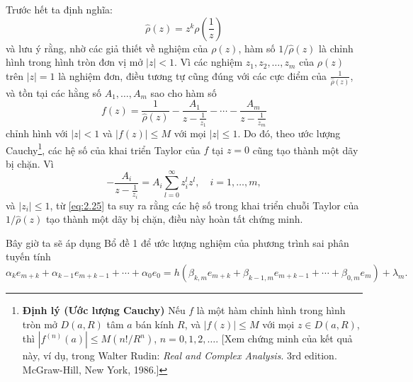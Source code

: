 Trước hết ta định nghĩa: 
\begin{equation*}
    \hat{\rho}(z) = z^k \rho\left(\frac{1}{z}\right)
\end{equation*} 
và lưu ý rằng, nhờ các giả thiết về nghiệm của $\rho(z)$, hàm số ${1}/\hat{\rho}(z)$ là chỉnh hình trong hình tròn đơn vị mở $|z| < 1$. Vì các nghiệm $z_1, z_2, \dots, z_m$ của $\rho(z)$ trên $|z| = 1$ là nghiệm đơn, điều tương tự cũng đúng với các cực điểm của $\frac{1}{\hat{\rho}(z)}$, và tồn tại các hằng số $A_1, \dots, A_m$ sao cho hàm số
\begin{equation}
    f(z) = \frac{1}{\hat{\rho}(z)} - \frac{A_1}{z - \frac{1}{z_1}} - \cdots - \frac{A_m}{z - \frac{1}{z_m}} \tag{2.25} \label{eq:2.25}
\end{equation}
chỉnh hình với $|z| < 1$ và $|f(z)| \le M$ với mọi $|z| \le 1$. Do đó, theo ước lượng Cauchy\footnote{\textbf{Định lý (Ước lượng Cauchy)} Nếu $f$ là một hàm chỉnh hình trong hình tròn mở $D(a, R)$ tâm $a$ bán kính $R$, và $|f(z)| \le M$ với mọi $z \in D(a, R)$, thì $|f^{(n)}(a)| \le M(n! / R^n)$, $n = 0, 1, 2, \dots$. [Xem chứng minh của kết quả này, ví dụ, trong Walter Rudin: \textit{Real and Complex Analysis}. 3rd edition. McGraw-Hill, New York, 1986.]}, các hệ số của khai triển Taylor của $f$ tại $z = 0$ cũng tạo thành một dãy bị chặn. Vì
\begin{equation*}
    -\frac{A_i}{z - \frac{1}{z_i}} = A_i \sum_{l=0}^\infty z_i^l z^l, \quad i = 1, \dots, m,
\end{equation*}
và $|z_i| \le 1$, từ \eqref{eq:2.25} ta suy ra rằng các hệ số trong khai triển chuỗi Taylor của $1/\hat{\rho}(z)$ tạo thành một dãy bị chặn, điều này hoàn tất chứng minh.

Bây giờ ta sẽ áp dụng Bổ đề 1 để ước lượng nghiệm của phương trình sai phân tuyến tính
\begin{equation}
    \alpha_k e_{m+k} + \alpha_{k-1} e_{m+k-1} + \cdots + \alpha_0 e_0 = h(\beta_{k,m} e_{m+k} + \beta_{k-1,m} e_{m+k-1} + \cdots + \beta_{0,m} e_m) + \lambda_m . \tag{2.26} \label{eq:2.26}
\end{equation}



